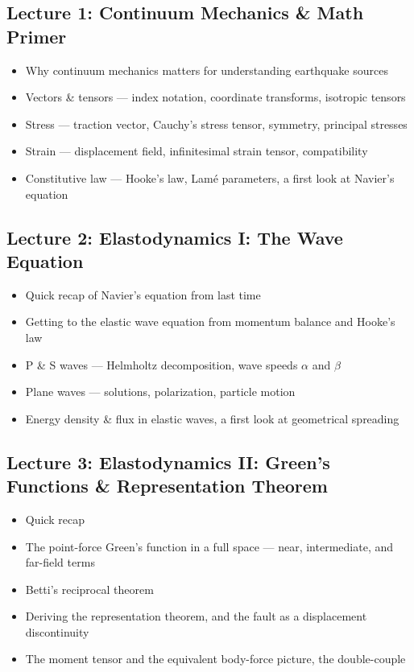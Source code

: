 \subsection*{Lecture 1: Continuum Mechanics \& Math Primer}
\begin{itemize}
    \item Why continuum mechanics matters for understanding earthquake sources
    \item Vectors \& tensors --- index notation, coordinate transforms, isotropic tensors
    \item Stress --- traction vector, Cauchy's stress tensor, symmetry, principal stresses
    
    \item Strain --- displacement field, infinitesimal strain tensor, compatibility
    \item Constitutive law --- Hooke's law, Lam\'e parameters, a first look at Navier's equation
    
\end{itemize}

\subsection*{Lecture 2: Elastodynamics I: The Wave Equation}
\begin{itemize}
    \item Quick recap of Navier's equation from last time
    \item Getting to the elastic wave equation from momentum balance and Hooke's law
    \item P \& S waves --- Helmholtz decomposition, wave speeds $\alpha$ and $\beta$
    
    \item Plane waves --- solutions, polarization, particle motion
    \item Energy density \& flux in elastic waves, a first look at geometrical spreading
    
\end{itemize}

\subsection*{Lecture 3: Elastodynamics II: Green's Functions \& Representation Theorem}
\begin{itemize}
    \item Quick recap
    \item The point-force Green's function in a full space --- near, intermediate, and far-field terms
    \item Betti's reciprocal theorem
    
    \item Deriving the representation theorem, and the fault as a displacement discontinuity
    \item The moment tensor and the equivalent body-force picture, the double-couple
    
\end{itemize}

